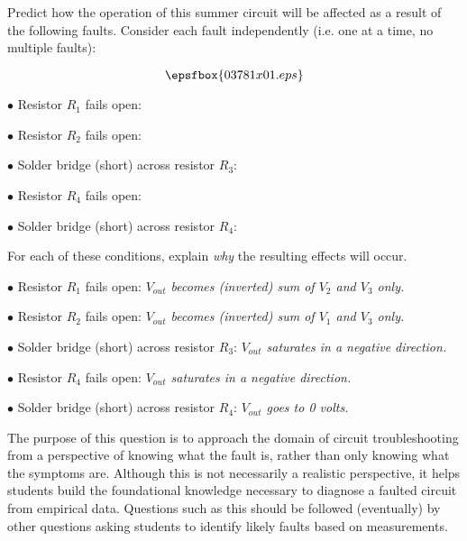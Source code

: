 

Predict how the operation of this summer circuit will be affected as a result of the following faults.  Consider each fault independently (i.e. one at a time, no multiple faults):

$$\epsfbox{03781x01.eps}$$

\medskip
\item{$\bullet$} Resistor $R_1$ fails open:
\vskip 5pt
\item{$\bullet$} Resistor $R_2$ fails open:
\vskip 5pt
\item{$\bullet$} Solder bridge (short) across resistor $R_3$:
\vskip 5pt
\item{$\bullet$} Resistor $R_4$ fails open:
\vskip 5pt
\item{$\bullet$} Solder bridge (short) across resistor $R_4$:
\medskip

For each of these conditions, explain {\it why} the resulting effects will occur.







\medskip
\item{$\bullet$} Resistor $R_1$ fails open: {\it $V_{out}$ becomes (inverted) sum of $V_2$ and $V_3$ only.}
\vskip 5pt
\item{$\bullet$} Resistor $R_2$ fails open: {\it $V_{out}$ becomes (inverted) sum of $V_1$ and $V_3$ only.}
\vskip 5pt
\item{$\bullet$} Solder bridge (short) across resistor $R_3$: {\it $V_{out}$ saturates in a negative direction.}
\vskip 5pt
\item{$\bullet$} Resistor $R_4$ fails open: {\it $V_{out}$ saturates in a negative direction.}
\vskip 5pt
\item{$\bullet$} Solder bridge (short) across resistor $R_4$: {\it $V_{out}$ goes to 0 volts.}
\medskip







The purpose of this question is to approach the domain of circuit troubleshooting from a perspective of knowing what the fault is, rather than only knowing what the symptoms are.  Although this is not necessarily a realistic perspective, it helps students build the foundational knowledge necessary to diagnose a faulted circuit from empirical data.  Questions such as this should be followed (eventually) by other questions asking students to identify likely faults based on measurements.




